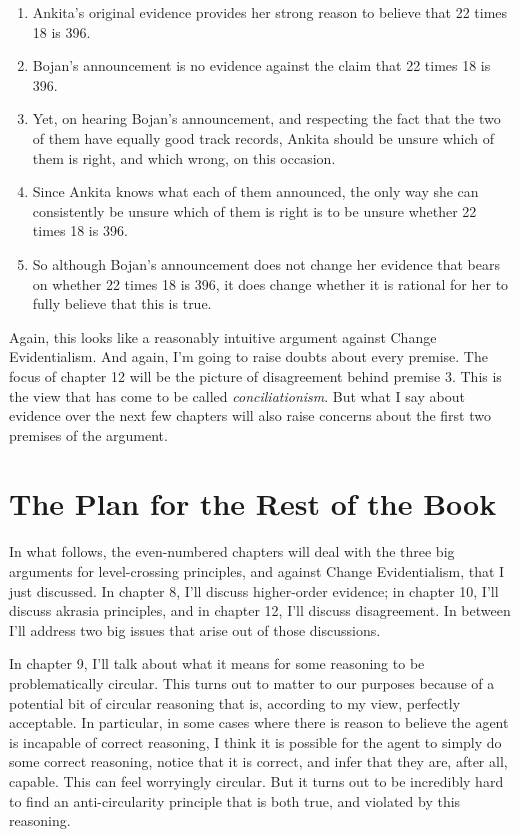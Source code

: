\begin{enumerate}
\item{} \gls{Ankita}'s original evidence provides her strong reason to believe that 22 times 18 is 396.

\item{} \gls{Bojan}'s announcement is no evidence against the claim that 22 times 18 is 396.

\item{} Yet, on hearing \gls{Bojan}'s announcement, and respecting the fact that the two of them have equally good track records, \gls{Ankita} should be unsure which of them is right, and which wrong, on this occasion.

\item{} Since \gls{Ankita} knows what each of them announced, the only way she can consistently be unsure which of them is right is to be unsure whether 22 times 18 is 396.

\item{} So although \gls{Bojan}'s announcement does not change her evidence that bears on whether 22 times 18 is 396, it does change whether it is rational for her to fully believe that this is true.

\end{enumerate}
Again, this looks like a reasonably intuitive argument against Change Evidentialism. And again, I'm going to raise doubts about every premise. The focus of chapter 12 will be the picture of disagreement behind premise 3. This is the view that has come to be called \emph{conciliationism}. But what I say about evidence over the next few chapters will also raise concerns about the first two premises of the argument.

\section{The Plan for the Rest of the Book}
\label{theplanfortherestofthebook}

In what follows, the even-numbered chapters will deal with the three big arguments for level-crossing principles, and against Change Evidentialism, that I just discussed. In chapter 8, I'll discuss higher-order evidence; in chapter 10, I'll discuss akrasia principles, and in chapter 12, I'll discuss disagreement. In between I'll address two big issues that arise out of those discussions.

In chapter 9, I'll talk about what it means for some reasoning to be problematically circular. This turns out to matter to our purposes because of a potential bit of circular reasoning that is, according to my view, perfectly acceptable. In particular, in some cases where there is reason to believe the agent is incapable of correct reasoning, I think it is possible for the agent to simply do some correct reasoning, notice that it is correct, and infer that they are, after all, capable. This can feel worryingly circular. But it turns out to be incredibly hard to find an anti-circularity principle that is both true, and violated by this reasoning.

